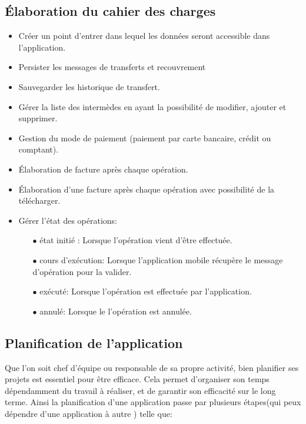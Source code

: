 \subsection{Élaboration du cahier des charges}
	
	\begin{itemize}
		\item Créer un point d'entrer dans lequel les données seront accessible dans l'application.\\
		\item Persister les messages de transferts et recouvrement\\
		\item Sauvegarder les historique de transfert.\\
		\item Gérer la liste des intermèdes en ayant la possibilité de modifier, ajouter et supprimer.\\
		\item Gestion du mode de paiement (paiement par carte bancaire, crédit ou comptant).\\
		\item Élaboration de facture après chaque opération.\\
		\item Élaboration d'une facture après chaque opération avec possibilité de la télécharger.\\
		\item Gérer l'état des opérations:\\
			\begin{itemize}
				\item[$\bullet$]  état initié : Lorsque l'opération vient d'être effectuée.\\
				\item[$\bullet$] cours d'exécution: Lorsque l'application mobile récupère le message d'opération pour la valider.\\
				\item[$\bullet$] exécuté: Lorsque l'opération est effectuée par l'application.\\
				\item[$\bullet$] annulé: Lorsque le l'opération est annulée.
			\end{itemize}
	\end{itemize}

\subsection{Planification de l'application}
	Que l’on soit chef d’équipe ou responsable de sa propre activité, bien planifier ses projets est essentiel pour être efficace. Cela permet d’organiser son temps dépendamment du travail à réaliser, et de garantir son efficacité sur le long terme. Ainsi la planification d'une application passe par plusieurs étapes(qui peux dépendre d'une application à autre ) telle que:\\
	
